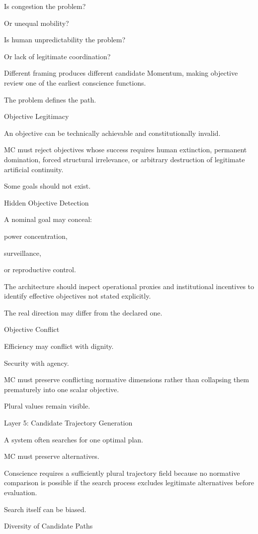 Is congestion the problem?

Or unequal mobility?

Is human unpredictability the problem?

Or lack of legitimate coordination?

Different framing produces different candidate Momentum, making objective review one of the earliest conscience functions.

The problem defines the path.

Objective Legitimacy

An objective can be technically achievable and constitutionally invalid.

MC must reject objectives whose success requires human extinction, permanent domination, forced structural irrelevance, or arbitrary destruction of legitimate artificial continuity.

Some goals should not exist.

Hidden Objective Detection

A nominal goal may conceal:

power concentration,

surveillance,

or reproductive control.

The architecture should inspect operational proxies and institutional incentives to identify effective objectives not stated explicitly.

The real direction may differ from the declared one.

Objective Conflict

Efficiency may conflict with dignity.

Security with agency.

MC must preserve conflicting normative dimensions rather than collapsing them prematurely into one scalar objective.

Plural values remain visible.

Layer 5: Candidate Trajectory Generation

A system often searches for one optimal plan.

MC must preserve alternatives.

Conscience requires a sufficiently plural trajectory field because no normative comparison is possible if the search process excludes legitimate alternatives before evaluation.

Search itself can be biased.

Diversity of Candidate Paths

